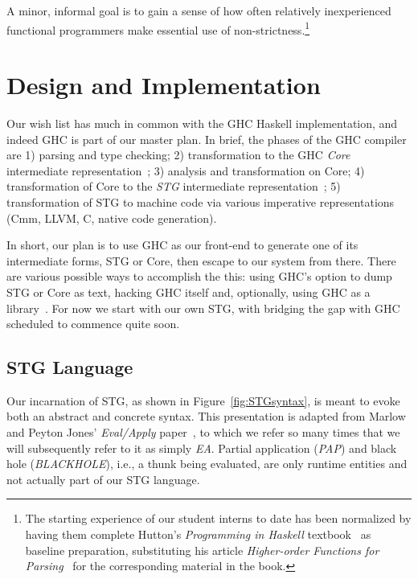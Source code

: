 \documentclass{llncs}
\begin{document}
A minor, informal goal is to gain a sense of how often relatively
inexperienced functional programmers make essential use of
non-strictness.\footnote{The starting experience of our student interns to
  date has been normalized by having them complete Hutton's \emph{Programming
    in Haskell} textbook~\cite{Hutton-book} as baseline preparation,
  substituting his article \emph{Higher-order Functions for
    Parsing}~\cite{Hutton-parsing:1992} for the corresponding material in the
  book.}

\section{Design and Implementation}
Our wish list has much in common with the GHC Haskell implementation, and
indeed GHC is part of our master plan.  In brief, the phases of the GHC
compiler are 1) parsing and type checking; 2) transformation to the GHC
\emph{Core} intermediate representation~\cite{Sulzmann:2007,ghc-core}; 3)
analysis and transformation on Core; 4) transformation of Core to the
\emph{STG} intermediate representation~\cite{PJ-stockhardware}; 5)
transformation of STG to machine code via various imperative
representations (Cmm, LLVM, C, native code generation).

In short, our plan is to use GHC as our front-end to generate one of its
intermediate forms, STG or Core, then escape to our system from there.  There
are various possible ways to accomplish the this: using GHC's option to dump
STG or Core as text, hacking GHC itself and, optionally, using GHC as a
library~\cite{ghc-as-library}.  For now we start with our own STG, with
bridging the gap with GHC scheduled to commence quite soon.

\subsection{STG Language}

Our incarnation of STG, as shown in Figure~\ref{fig:STGsyntax}, is meant to
evoke both an abstract and concrete syntax.  This presentation is adapted from
Marlow and Peyton Jones' \emph{Eval/Apply} paper~\cite{Marlow:2004}, to which
we refer so many times that we will subsequently refer to it as simply
\emph{EA}. Partial application (\emph{PAP}) and black hole (\emph{BLACKHOLE}),
i.e., a thunk being evaluated, are only runtime entities and not actually part
of our STG language.
\end{document}
